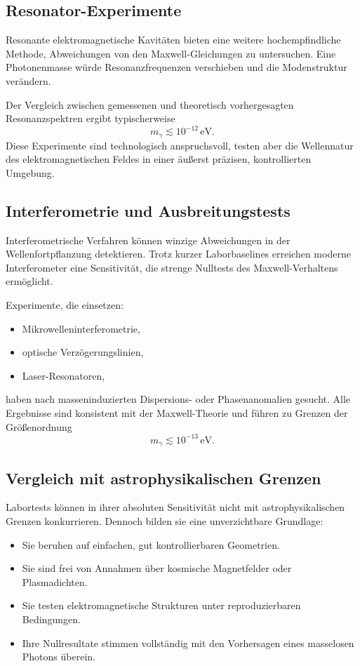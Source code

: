 \subsection*{Resonator-Experimente}

Resonante elektromagnetische Kavitäten bieten eine weitere hochempfindliche 
Methode, Abweichungen von den Maxwell-Gleichungen zu untersuchen. Eine 
Photonenmasse würde Resonanzfrequenzen verschieben und die Modenstruktur 
verändern.

Der Vergleich zwischen gemessenen und theoretisch vorhergesagten 
Resonanzspektren ergibt typischerweise
\[
m_\gamma \lesssim 10^{-12}\,\text{eV}.
\]
Diese Experimente sind technologisch anspruchsvoll, testen aber die 
Wellennatur des elektromagnetischen Feldes in einer äußerst präzisen, 
kontrollierten Umgebung.

\subsection*{Interferometrie und Ausbreitungstests}

Interferometrische Verfahren können winzige Abweichungen in der 
Wellenfortpflanzung detektieren. Trotz kurzer Laborbaselines erreichen 
moderne Interferometer eine Sensitivität, die strenge Nulltests des 
Maxwell-Verhaltens ermöglicht.

Experimente, die einsetzen:
\begin{itemize}
	\item Mikrowelleninterferometrie,
	\item optische Verzögerungslinien,
	\item Laser-Resonatoren,
\end{itemize}
haben nach masseninduzierten Dispersions- oder Phasenanomalien gesucht.  
Alle Ergebnisse sind konsistent mit der Maxwell-Theorie und führen zu 
Grenzen der Größenordnung
\[
m_\gamma \lesssim 10^{-13}\,\text{eV}.
\]

\subsection*{Vergleich mit astrophysikalischen Grenzen}

Labortests können in ihrer absoluten Sensitivität nicht mit 
astrophysikalischen Grenzen konkurrieren. Dennoch bilden sie eine 
unverzichtbare Grundlage:

\begin{itemize}
	\item Sie beruhen auf einfachen, gut kontrollierbaren Geometrien.
	\item Sie sind frei von Annahmen über kosmische Magnetfelder oder 
	Plasmadichten.
	\item Sie testen elektromagnetische Strukturen unter reproduzierbaren 
	Bedingungen.
	\item Ihre Nullresultate stimmen vollständig mit den Vorhersagen eines 
	masselosen Photons überein.
\end{itemize}

